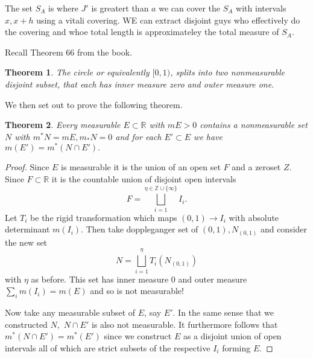 \documentclass[letter]{article}
\newtheorem{theorem}{Theorem}
\newenvironment{menumerate}{%
  \edef\backupindent{\the\parindent}%
  \enumerate%
  \setlength{\parindent}{\backupindent}%
}{\endenumerate}
\begin{document}
\begin{menumerate}
    \setcounter{enumi}{47}
    \item The set $S_A$ is where $J'$ is greatert than $a$ we can cover the $S_A$ with intervals $x, x+h$ using a vitali covering. WE can extract
    disjoint guys who effectively do the covering and whoe total length is approximateley the total measure of $S_A.$
    \setcounter{enumi}{49}
    \item Recall Theorem $66$ from the book.
    \begin{theorem}
        The circle or equivalently $[0,1)$, splits into two nonmeasurable disjoint subset, that each has inner measure zero and outer measure one.
    \end{theorem}
    We then set out to prove the following theorem.
    \begin{theorem}
        Every measurable $E \subset \mathbb{R}$ with $mE > 0$ contains a nonmeasurable set $N$ with $m^*N = mE, m_*N = 0$ and for each 
        $E' \subset E$ we have $m(E') = m^*(N\cap E').$
    \end{theorem}
    \begin{proof}
        Since $E$ is measurable it is the union of an open set $F$ and a zeroset $Z.$ Since $F \subset \mathbb{R}$ it is the countable union of
        disjoint open intervals
        \begin{equation}
            F = \bigsqcup_{i=1}^{\eta\in \mathbb{Z} \cup \{\infty\}} I_i.
        \end{equation}
        Let $T_i$ be the rigid transformation which maps $(0,1) \to I_i$ with absolute determinant $m(I_i).$ 
        Then take doppleganger set of $(0,1), N_{(0,1)}$ and consider the new set
        \begin{equation}
        N = \bigsqcup_{i=1}^\eta T_i(N_{(0,1)})
        \end{equation}
        with $\eta$ as before. This set has inner measure $0$ and outer measure $\sum_{i} m(I_i) = m(E)$ and so is not measurable!

        Now take any measurable subset of $E$, say $E'.$ In the same sense that we constructed $N,$ $N \cap E'$
        is also not measurable. It furthermore follows that $m^*(N \cap E') = m^*(E')$ since we construct $E$
        as a disjoint union of open intervals all of which are strict subsets of the respective $I_i$ forming $E.$


\end{proof}
\end{menumerate}
\end{document}
